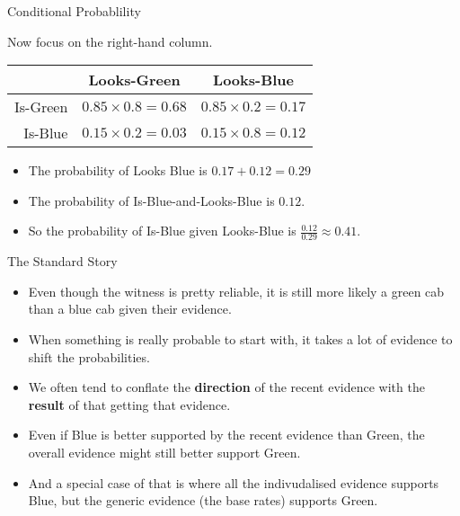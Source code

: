 \documentclass[
  ignorenonframetext,
]{beamer}
\providecommand{\tightlist}{%
  \setlength{\itemsep}{0pt}\setlength{\parskip}{0pt}}
\renewcommand{\,}{\text{, }}
\begin{document}
\begin{frame}{Conditional Probablility}
\protect\hypertarget{conditional-probablility}{}

Now focus on the right-hand column.

\begin{longtable}[]{@{}rcc@{}}
\toprule
& Looks-Green & Looks-Blue\tabularnewline
\midrule
\endhead
Is-Green & \(0.85 \times 0.8 = 0.68\) &
\(0.85 \times 0.2 = 0.17\)\tabularnewline
Is-Blue & \(0.15 \times 0.2 = 0.03\) &
\(0.15 \times 0.8 = 0.12\)\tabularnewline
\bottomrule
\end{longtable}

\pause

\begin{itemize}
\tightlist
\item
  The probability of Looks Blue is \(0.17 + 0.12 = 0.29\) \pause
\item
  The probability of Is-Blue-and-Looks-Blue is \(0.12\). \pause
\item
  So the probability of Is-Blue given Looks-Blue is
  \(\frac{0.12}{0.29} \approx 0.41\).
\end{itemize}

\end{frame}

\begin{frame}{The Standard Story}
\protect\hypertarget{the-standard-story}{}

\begin{itemize}[<+->]
\tightlist
\item
  Even though the witness is pretty reliable, it is still more likely a
  green cab than a blue cab given their evidence.
\item
  When something is really probable to start with, it takes a lot of
  evidence to shift the probabilities.
\item
  We often tend to conflate the \textbf{direction} of the recent
  evidence with the \textbf{result} of that getting that evidence.
\item
  Even if Blue is better supported by the recent evidence than Green,
  the overall evidence might still better support Green.
\item
  And a special case of that is where all the indivudalised evidence
  supports Blue, but the generic evidence (the base rates) supports
  Green.
\end{itemize}

\end{frame}
\end{document}
